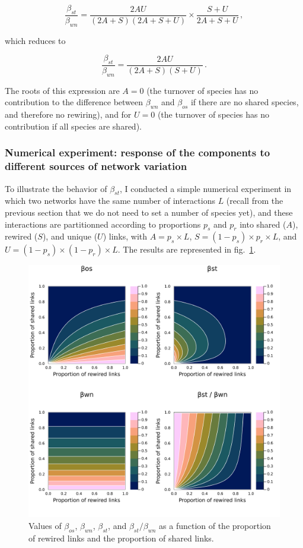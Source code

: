 \documentclass[11pt]{article}
\makeatletter
\def\maxwidth{\ifdim\Gin@nat@width>\linewidth\linewidth
\else\Gin@nat@width\fi}
\let\Oldincludegraphics\includegraphics
\renewcommand{\includegraphics}[1]{\Oldincludegraphics[width=\maxwidth]{#1}}
\makeatother
\begin{document}
\[\frac{\beta_{st}}{\beta_{wn}} = \frac{2AU}{(2A+S)(2A+S+U)}\times\frac{S+U}{2A+S+U}\,,\]

which reduces to

\[\frac{\beta_{st}}{\beta_{wn}} = \frac{2AU}{(2A+S)(S+U)}\,.\]

The roots of this expression are \(A=0\) (the turnover of species has no
contribution to the difference between \(\beta_{wn}\) and \(\beta_{os}\)
if there are no shared species, and therefore no rewiring), and for
\(U = 0\) (the turnover of species has no contribution if all species
are shared).

\hypertarget{numerical-experiment-response-of-the-components-to-different-sources-of-network-variation}{%
\subsubsection{Numerical experiment: response of the components to
different sources of network
variation}\label{numerical-experiment-response-of-the-components-to-different-sources-of-network-variation}}

To illustrate the behavior of \(\beta_{st}\), I conducted a simple
numerical experiment in which two networks have the same number of
interactions \(L\) (recall from the previous section that we do not need
to set a number of species yet), and these interactions are partitionned
according to proportions \(p_s\) and \(p_r\) into shared (\(A\)),
rewired (\(S\)), and unique (\(U\)) links, with \(A = p_s\times L\),
\(S = (1-p_s)\times p_r\times L\), and
\(U = (1-p_s)\times (1-p_r)\times L\). The results are represented in
fig.~\ref{fig:numexp1}.

\begin{figure}
\hypertarget{fig:numexp1}{%
\centering
\includegraphics{figures/numexp1.png}
\caption{Values of \(\beta_{os}\), \(\beta_{wn}\), \(\beta_{st}\), and
\(\beta_{st}/\beta_{wn}\) as a function of the proportion of rewired
links and the proportion of shared links.}\label{fig:numexp1}
}
\end{figure}
\end{document}
